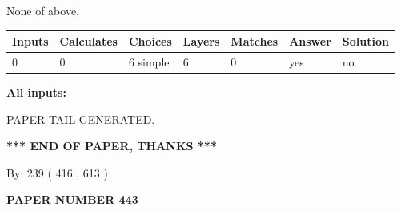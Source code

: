 \documentclass[12pt]{article}
\begin{document}
 
\noindent{}
 
 
 None of above.
 
 
\noindent{}
 
 
   
   
   
   
\noindent\begin{tabular}{|l|l|l|l|l|l|l|}
 \hline
Inputs & Calculates & Choices & Layers & Matches & Answer & Solution \\ \hline
 0  & 
 0  & 
 6
  simple  
  & 
 6  & 
 0  & 
  yes & 
  no 
  \\ \hline
 \end{tabular}
   
   
   
   
\noindent{}
   
   
   
   
\noindent\vspace{0.1in}\hspace{-0.08in} {\textbf{\Large{All inputs: }}}
   
   
   
   
   
   
 \vspace{0.2in}
 
   
   
\vspace{2.0in} PAPER TAIL GENERATED.
   
   
   
   
\vspace{1.0in} 
{\textbf{\large{ *** END OF PAPER, THANKS *** }}} 
   
   
\hspace{1.0in} By: 
 239 ( 416 ,  613 )
   
   
   
   
\newpage 
\setcounter{page}{ 
   443001 } 
   
   
   
   
 {\textbf{ \Large{ PAPER NUMBER  443  }}}
   
   
\vspace{0.2in}
   
   
   
\end{document}
